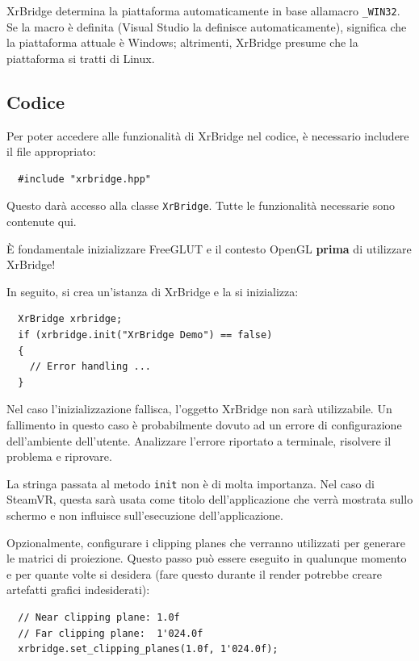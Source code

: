 \documentclass[twoside]{supsistudent}
\begin{document}
XrBridge determina la piattaforma automaticamente in base allamacro \texttt{\_WIN32}. Se la macro è definita (Visual Studio la definisce automaticamente), significa che la piattaforma attuale è Windows; altrimenti, XrBridge presume che la piattaforma si tratti di Linux.

\subsection{Codice}

Per poter accedere alle funzionalità di XrBridge nel codice, è necessario includere il file appropriato:

\begin{verbatim}
  #include "xrbridge.hpp"
\end{verbatim}

Questo darà accesso alla classe \texttt{XrBridge}. Tutte le funzionalità necessarie sono contenute qui.

È fondamentale inizializzare FreeGLUT e il contesto OpenGL \textbf{prima} di utilizzare XrBridge!

In seguito, si crea un'istanza di XrBridge e la si inizializza:

\begin{verbatim}
  XrBridge xrbridge;
  if (xrbridge.init("XrBridge Demo") == false)
  {
    // Error handling ...
  }
\end{verbatim}

Nel caso l'inizializzazione fallisca, l'oggetto XrBridge non sarà utilizzabile. Un fallimento in questo caso è probabilmente dovuto ad un errore di configurazione dell'ambiente dell'utente. Analizzare l'errore riportato a terminale, risolvere il problema e riprovare.

La stringa passata al metodo \texttt{init} non è di molta importanza. Nel caso di SteamVR, questa sarà usata come titolo dell'applicazione che verrà mostrata sullo schermo e non influisce sull'esecuzione dell'applicazione.

Opzionalmente, configurare i clipping planes che verranno utilizzati per generare le matrici di proiezione. Questo passo può essere eseguito in qualunque momento e per quante volte si desidera (fare questo durante il render potrebbe creare artefatti grafici indesiderati):

\begin{verbatim}
  // Near clipping plane: 1.0f
  // Far clipping plane:  1'024.0f
  xrbridge.set_clipping_planes(1.0f, 1'024.0f);
\end{verbatim}
\end{document}
